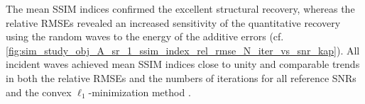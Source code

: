 The mean \ac{SSIM} indices confirmed
the excellent structural recovery, whereas
the relative \acp{RMSE} revealed
an increased sensitivity of
the quantitative recovery using
the random waves to
the energy of
the additive errors
(cf. \cref{fig:sim_study_obj_A_sr_1_ssim_index_rel_rmse_N_iter_vs_snr_kap}).
All incident waves achieved
mean \ac{SSIM} indices close to
unity and
comparable trends in both
the relative \acp{RMSE} and
the numbers of
iterations for
all reference \acp{SNR} and
the convex $\ell_{1}$-minimization method
.
